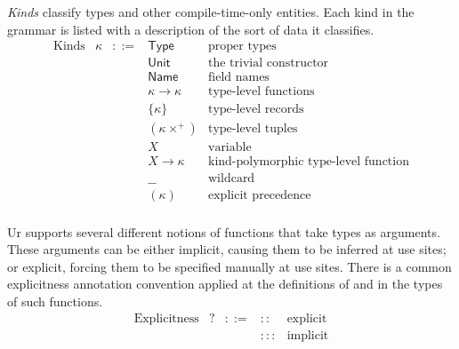 \documentclass{article}
\newcommand{\mt}[1]{\mathsf{#1}}
\begin{document}
\emph{Kinds} classify types and other compile-time-only entities.  Each kind in the grammar is listed with a description of the sort of data it classifies.
$$\begin{array}{rrcll}
  \textrm{Kinds} & \kappa &::=& \mt{Type} & \textrm{proper types} \\
  &&& \mt{Unit} & \textrm{the trivial constructor} \\
  &&& \mt{Name} & \textrm{field names} \\
  &&& \kappa \to \kappa & \textrm{type-level functions} \\
  &&& \{\kappa\} & \textrm{type-level records} \\
  &&& (\kappa\times^+) & \textrm{type-level tuples} \\
  &&& X & \textrm{variable} \\
  &&& X \longrightarrow \kappa & \textrm{kind-polymorphic type-level function} \\
  &&& \_\_ & \textrm{wildcard} \\
  &&& (\kappa) & \textrm{explicit precedence} \\
\end{array}$$

Ur supports several different notions of functions that take types as arguments.  These arguments can be either implicit, causing them to be inferred at use sites; or explicit, forcing them to be specified manually at use sites.  There is a common explicitness annotation convention applied at the definitions of and in the types of such functions.
$$\begin{array}{rrcll}
  \textrm{Explicitness} & ? &::=& :: & \textrm{explicit} \\
  &&& ::: & \textrm{implicit}
\end{array}$$
\end{document}
